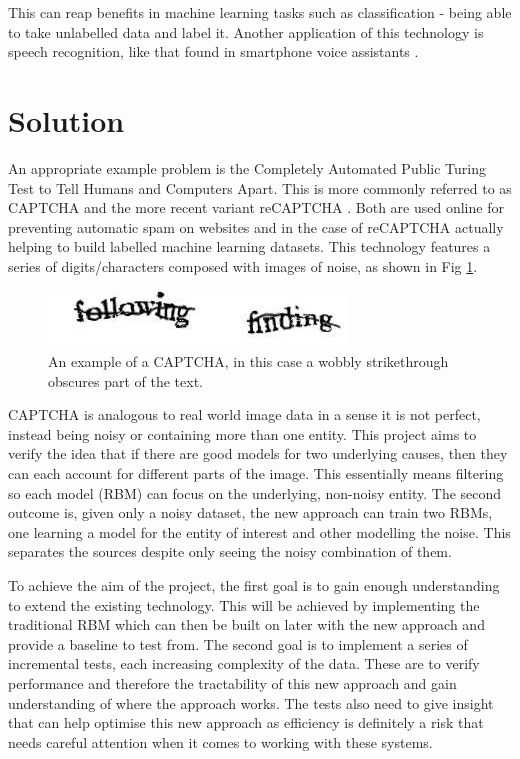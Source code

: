This can reap benefits in machine learning tasks such as classification - being able to take unlabelled data and label it. Another application of this technology is speech recognition, like that found in smartphone voice assistants \cite{Ling:2015by}.

\section{Solution}\label{S:introsolution}

An appropriate example problem is the Completely Automated  Public Turing Test to Tell Humans and Computers Apart. This is more commonly referred to as CAPTCHA and the more recent variant reCAPTCHA \cite{1_shet_2014}. Both are used online for preventing automatic spam on websites and in the case of reCAPTCHA actually helping to build labelled machine learning datasets. This technology features a series of digits/characters composed with images of noise, as shown in Fig \ref{F:modernCaptcha}.


\begin{figure}[]
\begin{center}
	\includegraphics[]{Assets/Modern-captcha}
\caption{An example of a CAPTCHA, in this case a wobbly strikethrough obscures part of the text. \cite{pict} }
\label{F:modernCaptcha}
\end{center}
\end{figure}


CAPTCHA is analogous to real world image data in a sense it is not perfect, instead being noisy or containing more than one entity.
This project aims to verify the idea that if there are good models for two underlying causes, then they can each account for different parts of the image. This essentially means filtering so each model (RBM) can focus on the underlying, non-noisy entity.
The second outcome is, given only a noisy dataset,
the new approach can train two RBMs, one learning a model for the entity of interest and other modelling the noise. This separates the sources despite only seeing the noisy combination of them.

To achieve the aim of the project, the first goal is to gain enough understanding to extend the existing technology. This will be achieved by implementing the traditional RBM which can then be built on later with the new approach and provide a baseline to test from. The second goal is to implement a series of incremental tests, each increasing complexity of the data. These are to verify performance and therefore the tractability of this new approach and gain understanding of where the approach works. The tests also need to give insight that can help optimise this new approach as efficiency is definitely a risk that needs careful attention when it comes to working with these systems.

